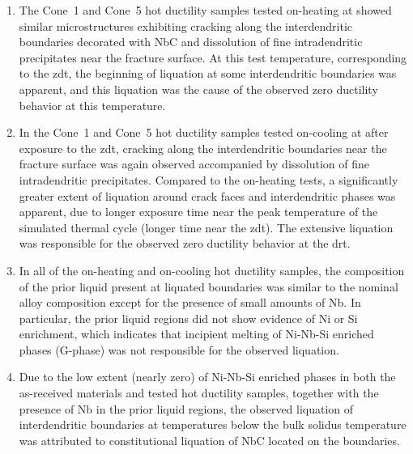 \begin{enumerate}
\item The Cone~1 and Cone~5 hot ductility samples tested on-heating at  showed similar microstructures exhibiting cracking along the interdendritic boundaries decorated with NbC and dissolution of fine intradendritic precipitates near the fracture surface. At this test temperature, corresponding to the \gls{zdt}, the beginning of liquation at some interdendritic boundaries was apparent, and this liquation was the cause of the observed zero ductility behavior at this temperature.
\item In the Cone~1 and Cone~5 hot ductility samples tested on-cooling at  after exposure to the \gls{zdt}, cracking along the interdendritic boundaries near the fracture surface was again observed accompanied by dissolution of fine intradendritic precipitates. Compared to the on-heating tests, a significantly greater extent of liquation around crack faces and interdendritic phases was apparent, due to longer exposure time near the peak temperature of the simulated thermal cycle (longer time near the \gls{zdt}). The extensive liquation was responsible for the observed zero ductility behavior at the \gls{drt}.
\item In all of the on-heating and on-cooling hot ductility samples, the composition of the prior liquid present at liquated boundaries was similar to the nominal alloy composition except for the presence of small amounts of Nb. In particular, the prior liquid regions did not show evidence of Ni or Si enrichment, which indicates that incipient melting of Ni-Nb-Si enriched phases (G-phase) was not responsible for the observed liquation.
\item Due to the low extent (nearly zero) of Ni-Nb-Si enriched phases in both the as-received materials and tested hot ductility samples, together with the presence of Nb in the prior liquid regions, the observed liquation of interdendritic boundaries at temperatures below the bulk solidus temperature was attributed to constitutional liquation of NbC located on the boundaries.

\end{enumerate}


